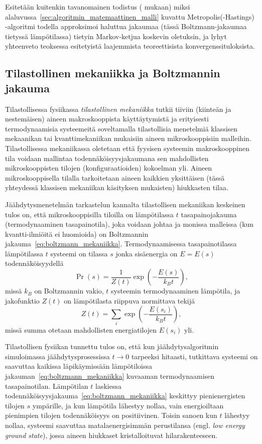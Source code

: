 Esitetään kuitenkin tavanomainen todistus (\cite{chib95} mukaan) miksi alaluvussa~\ref{sec:algoritmin_matemaattinen_malli} kuvattu Metropolis(-Hastings) -algoritmi todella approksimoi haluttua jakaumaa (tässä Boltzmann-jakaumaa tietyssä lämpötilassa) tietyin Markov-ketjua koskevin oletuksin,
ja lyhyt yhteenveto teoksessa \cite{laarhoven} esitetyistä laajemmista teoreettisista konvergenssituloksista.

\subsection{Tilastollinen mekaniikka ja Boltzmannin jakauma}
\label{sub:tilastollinen_mekaniikka}

Tilastollisessa fysiikassa \emph{tilastollinen mekaniikka} tutkii tiiviin (kiinteän ja nestemäisen) aineen makroskooppista käyttäytymistä ja erityisesti termodynaamisia systeemeitä soveltamalla tilastollisia menetelmiä klassisen mekaanikan tai kvanttimekaniikan mukaisiin aineen mikroskooppisiin malleihin.
Tilastollisessa mekaniikassa oletetaan että fyysisen systeemin makroskooppinen tila voidaan mallintaa todennäköisyysjakaumana sen mahdollisten mikroskooppisten tilojen (konfiguraatioiden) kokoelman yli.
Aineen mikroskooppisella tilalla tarkoitetaan aineen kaikkien yksittäisen (tässä yhteydessä klassisen mekaniikan käsityksen mukaisten) hiukkasten tilaa.

Jäähdytysmenetelmän tarkastelun kannalta tilastollisen mekaniikan keskeinen tulos on,
että mikroskooppisilla tiloilla on lämpötilassa $t$ tasapainojakauma (termodynaaminen tasapainotila),
joka voidaan johtaa \cite[ks. esim.][luku 5]{salamonetal} ja monissa malleissa (kun kvantti-ilmiöitä ei huomioida) on Boltzmannin jakauma~\ref{eq:boltzmann_mekaniikka}.
Termodynaamisessa tasapainotilassa lämpötilassa $t$ systeemi on tilassa $s$ jonka sisäenergia on $E = E(s)$ todennäköisyydellä
\begin{equation}
    \label{eq:boltzmann_mekaniikka}
    \Pr\left(s\right) = \frac{1}{Z(t)} \exp \left(-\frac{E(s)}{k_B t}\right),
\end{equation}
missä $k_B$ on Boltzmannin vakio, $t$ systeemin termodynaaminen lämpötila,
ja jakofunktio $Z(t)$ on lämpötilasta riippuva normittava tekijä
\begin{equation}
    Z(t) = \sum_{i} \exp \left(-\frac{E(s_i)}{k_Bt}\right),
\end{equation}
missä summa otetaan mahdollisten energiatilojen $E(s_i)$ yli.

Tilastollisen fysiikan tunnettu tulos on, että kun jäähdytysalgoritmin simuloimassa jäähdytysprosessissa $t \to 0$ tarpeeksi hitaasti,
tutkittava systeemi on saavuttaa kaikissa läpikäymissään lämpötiloissa jakauman~\ref{eq:boltzmann_mekaniikka} kuvaaman termodynaamisen tasapainotilan.
Lämpötilan $t$ laskiessa todennäköisyysjakauma~\ref{eq:boltzmann_mekaniikka} keskittyy pienienergisten tilojen $s$ ympärille,
ja kun lämpötila lähestyy nollaa, vain energioiltaan pienimpien tilojen todennäköisyys on positiivinen.
Toisin sanoen kun $t$ lähestyy nollaa, systeemi saavuttaa matalaenergisimmän perustilansa (engl. \emph{low energy ground state}),
jossa aineen hiukkaset kristalloituvat hilarakenteeseen.

